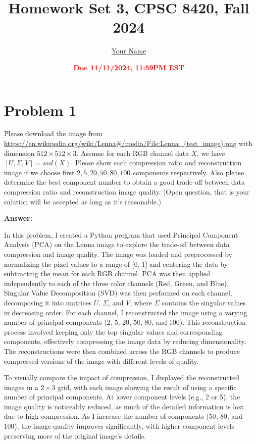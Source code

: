 \documentclass[11pt]{article}
\title{{\bf Homework Set 3, CPSC 8420, Fall 2024}} %
\author{\Large\underline{Your Name}}
\date{\textbf{\Large\textcolor{red}{Due 11/11/2024, 11:59PM EST}}} %
\begin{document}
	\maketitle
	

\section*{Problem 1}
Please download the image from \url{https://en.wikipedia.org/wiki/Lenna#/media/File:Lenna_(test_image).png} with dimension $512\times512\times3$. Assume for each RGB channel data $X$, we have $[U,\Sigma,V]=svd(X)$. Please show each compression ratio and reconstruction image if we choose first $2, 5, 20, 50,80,100$ components respectively. Also please determine the best component number to obtain a good trade-off between data compression ratio and reconstruction image quality. (Open question, that is your solution will be accepted as long as it's reasonable.)


\textbf{Answer:}

In this problem, I created a Python program that used Principal Component Analysis (PCA) on the Lenna image to explore the trade-off between data compression and image quality. 
The image was loaded and preprocessed by normalizing the pixel values to a range of [0, 1] and centering the data by subtracting the mean for each RGB channel. 
PCA was then applied independently to each of the three color channels (Red, Green, and Blue). Singular Value Decomposition (SVD) was then performed on each channel, decomposing it into matrices \( U \), \( \Sigma \), and \( V \), 
where \( \Sigma \) contains the singular values in decreasing order. 
For each channel, I reconstructed the image using a varying number of principal components (2, 5, 20, 50, 80, and 100). 
This reconstruction process involved keeping only the top singular values and corresponding components, effectively compressing the image data by reducing dimensionality. 
The reconstructions were then combined across the RGB channels to produce compressed versions of the image with different levels of quality.

To visually compare the impact of compression, I displayed the reconstructed images in a \(2 \times 3\) grid, with each image showing the result of using a specific number of principal components. 
At lower component levels (e.g., 2 or 5), the image quality is noticeably reduced, as much of the detailed information is lost due to high compression. 
As I increase the number of components (50, 80, and 100), the image quality improves significantly, with higher component levels preserving more of the original image’s details. 
\end{document}
